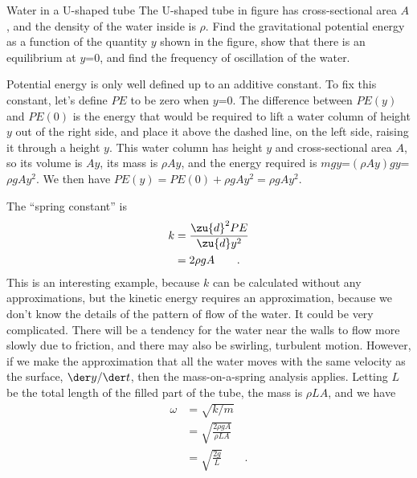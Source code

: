         \begin{eg}{Water in a U-shaped tube}\label{eg:utube}
        \egquestion
        The U-shaped tube in figure  has cross-sectional area
         $A$, and the density of the water inside
        is $\rho$. Find the gravitational potential energy as a function of the quantity $y$ shown in the
        figure, show that there is an equilibrium at $y$=0, and find
        the frequency of oscillation of the water.

        \eganswer
        Potential energy is only well defined
        up to an additive constant. To fix this constant, let's define $PE$ to be zero when $y$=0.
        The difference between $PE( y)$ and $PE(0)$ is the energy that would
        be required to lift a water column of height $y$ out of the right side, and place it
        above the dashed line, on the left side, raising it through a height $y$.
        This water column has height $y$ and
        cross-sectional area $A$, so its volume is $Ay$, its mass is $\rho Ay$, and
        the energy required is $mgy$=$(\rho Ay) gy$=$\rho gAy^2$.
        We then have $PE( y)= PE(0)+\rho gAy^2=\rho gAy^2$.

        The ``spring constant'' is
        \begin{align*}
                 k        &= \frac{\zu{d}^2 PE}{\zu{d} y^2} \\
                                &= 2\rho gA \qquad .
        \end{align*}
        This is an interesting example, because $k$ can be calculated without any
        approximations, but the kinetic energy requires an approximation, because we
        don't know the details of the pattern of flow of the water. It could be very complicated.
        There will be a tendency for the water near the walls to flow more slowly due to
        friction, and there may also be swirling, turbulent motion. However, if we make
        the approximation that all the water moves with the same velocity as the surface,
        $\der y/\der t$, then the mass-on-a-spring analysis applies. Letting
        $L$ be the total length of the filled part of the tube, the mass is $\rho LA$, and
        we have
        \begin{align*}
                 \omega        &= \sqrt{ k/ m} \\
                               &= \sqrt{\frac{2\rho gA}{\rho LA}} \\
                               &= \sqrt{\frac{2g}{L}} \qquad .
        \end{align*}
        \end{eg}


